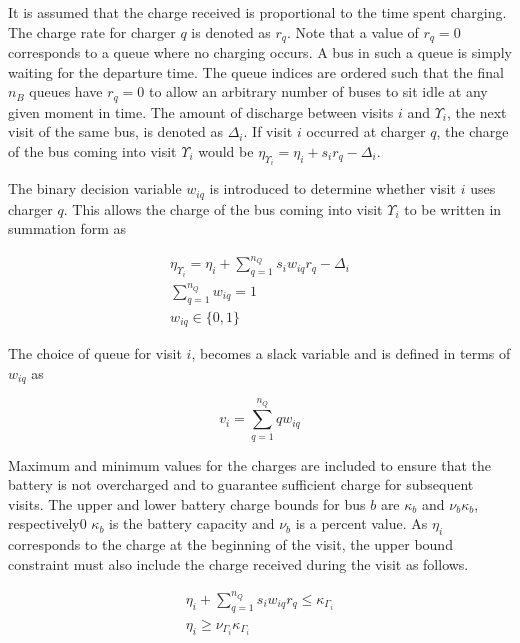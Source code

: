 \documentclass[11pt,a4paper,final]{article}
\begin{document}
It is assumed that the charge received is proportional to the time spent charging. The charge rate for charger \(q\) is
denoted as \(r_q\). Note that a value of \(r_q = 0\) corresponds to a queue where no charging occurs. A bus in such a queue
is simply waiting for the departure time. The queue indices are ordered such that the final \(n_B\) queues have \(r_q = 0\)
to allow an arbitrary number of buses to sit idle at any given moment in time. The amount of discharge between visits
\(i\) and \(\Upsilon_i\), the next visit of the same bus, is denoted as \(\Delta_i\). If visit \(i\) occurred at charger \(q\), the charge of
the bus coming into visit \(\Upsilon_i\) would be \(\eta_{\Upsilon_i} = \eta_i + s_i r_q - \Delta_i\).

The binary decision variable \(w_{iq}\) is introduced to determine whether visit \(i\) uses charger \(q\). This allows the
charge of the bus coming into visit \(\Upsilon_i\) to be written in summation form as

\begin{subequations}
    \label{subeq:pre_next_charge}
\begin{align}
    \eta_{\Upsilon_i} = \eta_i + \sum_{q=1}^{n_Q} s_i w_{iq} r_q - \Delta_i  \\
    \sum_{q=1}^{n_Q} w_{iq} = 1 \\
    w_{iq} \in \{0,1\}
\end{align}
\end{subequations}

The choice of queue for visit \(i\), becomes a slack variable and is defined in terms of \(w_{iq}\) as

\begin{equation}
    v_i = \sum_{q=1}^{n_Q} qw_{iq}
\end{equation}

Maximum and minimum values for the charges are included to ensure that the battery is not overcharged and to guarantee
sufficient charge for subsequent visits. The upper and lower battery charge bounds for bus \(b\) are \(\kappa_b\) and \(\nu_b \kappa_b\),
respectively0 \(\kappa_b\) is the battery capacity and \(\nu_b\) is a percent value. As \(\eta_i\) corresponds to the charge at the
beginning of the visit, the upper bound constraint must also include the charge received during the visit as follows.

\begin{subequations}
    \label{subeq:pre_min_max}
\begin{align}
    \eta_i + \sum_{q=1}^{n_Q} s_i w_{iq} r_q \leq \kappa_{\Gamma_i}                 \\
    \eta_i \geq \nu_{\Gamma_i} \kappa_{\Gamma_i}
\end{align}
\end{subequations}
\end{document}
